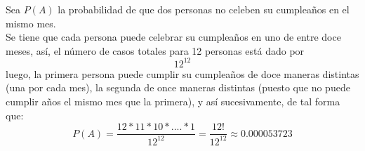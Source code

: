 \documentclass[12pt,a4paper]{report}
\begin{document}
\begin{enumerate}
{	Sea $P(A)$ la probabilidad de que dos personas no celeben su cumpleaños en el
	mismo mes.\\

	Se tiene que cada persona puede celebrar su cumpleaños en uno de entre doce
	meses, así, el número de casos totales para 12 personas está dado por
		$$12^{12}$$
	luego, la primera persona puede cumplir su cumpleaños de doce maneras distintas
	(una por cada mes), la segunda de once maneras distintas (puesto que no puede
	cumplir años el mismo mes que la primera), y así sucesivamente, de tal forma
	que:
		$$P(A) = \frac{12 * 11 * 10 * .... * 1}{12^{12}} = \frac{12!}{12^{12}}
				\approx 0.000053723$$
  }





\end{enumerate}
\end{document}
